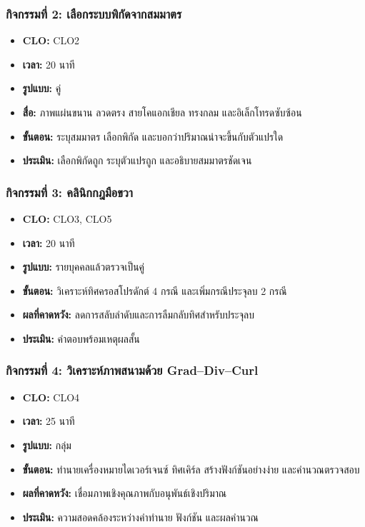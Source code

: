 \subsubsection{กิจกรรมที่ 2: เลือกระบบพิกัดจากสมมาตร}

\begin{itemize}
\item \textbf{CLO:} CLO2
\item \textbf{เวลา:} 20 นาที
\item \textbf{รูปแบบ:} คู่
\item \textbf{สื่อ:} ภาพแผ่นขนาน ลวดตรง สายโคแอกเชียล ทรงกลม และอิเล็กโทรดซับซ้อน
\item \textbf{ขั้นตอน:} ระบุสมมาตร เลือกพิกัด และบอกว่าปริมาณน่าจะขึ้นกับตัวแปรใด
\item \textbf{ประเมิน:} เลือกพิกัดถูก ระบุตัวแปรถูก และอธิบายสมมาตรชัดเจน
\end{itemize}

\subsubsection{กิจกรรมที่ 3: คลินิกกฎมือขวา}

\begin{itemize}
\item \textbf{CLO:} CLO3, CLO5
\item \textbf{เวลา:} 20 นาที
\item \textbf{รูปแบบ:} รายบุคคลแล้วตรวจเป็นคู่
\item \textbf{ขั้นตอน:} วิเคราะห์ทิศครอสโปรดักต์ 4 กรณี และเพิ่มกรณีประจุลบ 2 กรณี
\item \textbf{ผลที่คาดหวัง:} ลดการสลับลำดับและการลืมกลับทิศสำหรับประจุลบ
\item \textbf{ประเมิน:} คำตอบพร้อมเหตุผลสั้น
\end{itemize}

\subsubsection{กิจกรรมที่ 4: วิเคราะห์ภาพสนามด้วย Grad--Div--Curl}

\begin{itemize}
\item \textbf{CLO:} CLO4
\item \textbf{เวลา:} 25 นาที
\item \textbf{รูปแบบ:} กลุ่ม
\item \textbf{ขั้นตอน:} ทำนายเครื่องหมายไดเวอร์เจนซ์ ทิศเคิร์ล สร้างฟังก์ชันอย่างง่าย และคำนวณตรวจสอบ
\item \textbf{ผลที่คาดหวัง:} เชื่อมภาพเชิงคุณภาพกับอนุพันธ์เชิงปริมาณ
\item \textbf{ประเมิน:} ความสอดคล้องระหว่างคำทำนาย ฟังก์ชัน และผลคำนวณ
\end{itemize}

